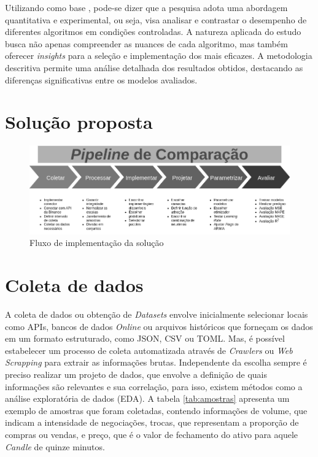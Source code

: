 Utilizando como base \textcite{pesquisa}, pode-se dizer que a pesquisa adota
uma abordagem quantitativa e experimental, ou seja, visa analisar e contrastar o desempenho
de diferentes algoritmos em condições controladas. A natureza aplicada do estudo busca não
apenas compreender as nuances de cada algoritmo, mas também oferecer \textit{insights} para a seleção
e implementação dos mais eficazes. A metodologia descritiva permite uma análise detalhada
dos resultados obtidos, destacando as diferenças significativas entre os modelos avaliados.

\section{Solução proposta} \label{sec:solucao}

\begin{figure}[!htb] \centering
    \caption{Fluxo de implementação da solução} \label{figura:proposta}
    \begin{varwidth}{\linewidth}
      \includegraphics[width=16cm]{figuras/proposta.png}
    \end{varwidth}
  \end{figure}

\section{Coleta de dados} \label{sec:coleta}
A coleta de dados ou obtenção de \textit{Datasets} envolve inicialmente selecionar locais como APIs, bancos de dados \textit{Online} ou arquivos históricos que forneçam os dados em um formato estruturado, como JSON, CSV ou TOML.
Mas, é possível estabelecer um processo de coleta automatizada através de \textit{Crawlers} ou \textit{Web Scrapping} para extrair as informações brutas.
Independente da escolha sempre é preciso realizar um projeto de dados, que envolve a definição de quais informações são relevantes e sua correlação, para isso, existem métodos como a análise exploratória de dados (EDA).
A tabela \ref{tab:amostras} apresenta um exemplo de amostras que foram coletadas, contendo informações de volume, que indicam a intensidade de negociações, trocas, que representam a proporção de compras ou vendas, e preço, que é o valor de fechamento do ativo para aquele \textit{Candle} de quinze minutos.

